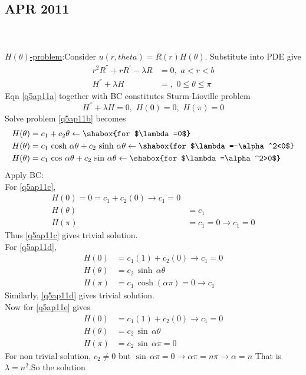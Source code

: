 \subsection{APR 2011}
\\
\\
\underline{$H(\theta)$-problem}:Consider $u(r,theta)=R(r)H(\theta)$. Substitute into PDE give
\begin{align}
r^2R^{''}+rR^{'}-\lambda R&=0,\,\,a<r<b\label{q5ap11}\\
H^{''}+\lambda H&=,\,\,0\le\theta\le\pi\label{q5ap11a}
\end{align}
Eqn \eqref{q5ap11a} together with BC constitutes Sturm-Lioville problem
\begin{equation}
H^{''}+\lambda H=0,\,\,H(0)=0,\,\,H(\pi)=0\label{q5ap11b}
\end{equation}
Solve problem \eqref{q5ap11b} becomes
\begin{align}
H(\theta)&=c_1+c_2\theta\leftarrow\shabox{for $\lambda=0$}\label{q5ap11c}\\
H(\theta)&=c_1\,\cosh\,\alpha\theta+c_2\,\sinh\,\alpha\theta\leftarrow\shabox{for $\lambda=-\alpha^2<0$}\label{q5ap11d}\\
H(\theta)&=c_1\,\cos\,\alpha\theta+c_2\,\sin\,\alpha\theta\leftarrow\shabox{for $\lambda=\alpha^2>0$}\label{q5ap11e}
\end{align}
Apply BC:\\
For \eqref{q5ap11c},
\begin{align*}
H(0)=0=c_1+c_2(0)\to c_1=0\\
H(\theta)&=c_1\\
H(\pi)&=c_1=0\to c_1=0
\end{align*}
Thus \eqref{q5ap11c} gives  trivial solution.\\
For \eqref{q5ap11d},
\begin{align*}
H(0)&=c_1(1)+c_2(0)\to c_1=0\\
H(\theta)&=c_2\,\sinh\,\alpha\theta\\
H(\pi)&=c_1\,\cosh(\alpha\pi)=0\to c_1
\end{align*}
Similarly, \eqref{q5ap11d} gives trivial solution.\\
Now for \eqref{q5ap11e} gives
\begin{align*}
H(0)&=c_1(1)+c_2(0)\to c_1=0\\
H(\theta)&=c_2\,\sin\,\alpha\theta\\
H(\pi)&=c_2\,\sin\,\alpha\pi=0
\end{align*}
For non trivial solution, $c_2\neq 0$ but $\sin\,\alpha\pi=0\to \alpha\pi=n\pi\to\alpha=n$ That is $\lambda=n^2$.So the solution
